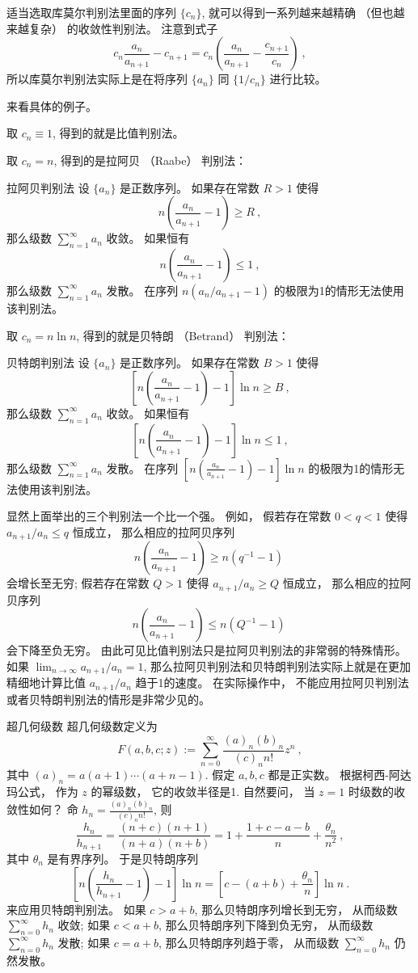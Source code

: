 适当选取库莫尔判别法里面的序列 $\{c_n\}$, 就可以得到一系列越来越精确 （但也越来越复杂） 的收敛性判别法。 注意到式子
$$
c_n\frac{a_n}{a_{n+1}}-c_{n+1}=c_n\left(\frac{a_n}{a_{n+1}}-\frac{c_{n+1}}{c_n}\right)~,
$$
所以库莫尔判别法实际上是在将序列 $\{a_n\}$ 同 $\{1/c_n\}$ 进行比较。

来看具体的例子。 

取 $c_n\equiv1$, 得到的就是比值判别法。

取 $c_n=n$, 得到的是拉阿贝 （Raabe） 判别法：

\begin{theorem}{拉阿贝判别法}
设 $\{a_n\}$ 是正数序列。 如果存在常数 $R>1$ 使得
$$
n\left(\frac{a_n}{a_{n+1}}-1\right)\geq R~,
$$
那么级数 $\sum_{n=1}^\infty a_n$ 收敛。 如果恒有
$$
n\left(\frac{a_n}{a_{n+1}}-1\right)\leq 1~,
$$
那么级数 $\sum_{n=1}^\infty a_n$ 发散。 在序列 $n(a_n/a_{n+1}-1)$ 的极限为1的情形无法使用该判别法。
\end{theorem}

取 $c_n=n\ln n$, 得到的就是贝特朗 （Betrand） 判别法：
\begin{theorem}{贝特朗判别法}
设 $\{a_n\}$ 是正数序列。 如果存在常数 $B>1$ 使得
$$
\left[n\left(\frac{a_n}{a_{n+1}}-1\right)-1\right]\ln n\geq B~,
$$
那么级数 $\sum_{n=1}^\infty a_n$ 收敛。 如果恒有
$$
\left[n\left(\frac{a_n}{a_{n+1}}-1\right)-1\right]\ln n\leq1~,
$$
那么级数 $\sum_{n=1}^\infty a_n$ 发散。 在序列 $\left[n\left(\frac{a_n}{a_{n+1}}-1\right)-1\right]\ln n$ 的极限为1的情形无法使用该判别法。
\end{theorem}

显然上面举出的三个判别法一个比一个强。 例如， 假若存在常数 $0<q<1$ 使得 $a_{n+1}/a_{n}\leq q$ 恒成立， 那么相应的拉阿贝序列
$$
n\left(\frac{a_n}{a_{n+1}}-1\right)\geq n(q^{-1}-1)~
$$
会增长至无穷; 假若存在常数 $Q>1$ 使得 $a_{n+1}/a_{n}\geq Q$ 恒成立， 那么相应的拉阿贝序列
$$
n\left(\frac{a_n}{a_{n+1}}-1\right)\leq n(Q^{-1}-1)~
$$
会下降至负无穷。 由此可见比值判别法只是拉阿贝判别法的非常弱的特殊情形。 如果 $\lim_{n\to\infty}a_{n+1}/a_{n}=1$, 那么拉阿贝判别法和贝特朗判别法实际上就是在更加精细地计算比值 $a_{n+1}/a_{n}$ 趋于1的速度。 在实际操作中， 不能应用拉阿贝判别法或者贝特朗判别法的情形是非常少见的。

\begin{example}{超几何级数}
超几何级数定义为
$$
F(a,b,c;z):=\sum_{n=0}^\infty\frac{(a)_n(b)_n}{(c)_nn!}z^{n}~,
$$
其中 $(a)_n=a(a+1)\dotsm(a+n-1)$. 假定 $a,b,c$ 都是正实数。 根据柯西-阿达玛公式， 作为 $z$ 的幂级数， 它的收敛半径是1. 自然要问， 当 $z=1$ 时级数的收敛性如何？ 
命 $h_n=\frac{(a)_n(b)_n}{(c)_nn!}$, 则
$$
\frac{h_n}{h_{n+1}}=\frac{(n+c)(n+1)}{(n+a)(n+b)}
=1+\frac{1+c-a-b}{n}+\frac{\theta_n}{n^2}~,
$$
其中 $\theta_n$ 是有界序列。 于是贝特朗序列
$$
\left[n\left(\frac{h_n}{h_{n+1}}-1\right)-1\right]\ln n
=\left[c-(a+b)+\frac{\theta_n}{n}\right]\ln n~.
$$
来应用贝特朗判别法。 如果 $c>a+b$, 那么贝特朗序列增长到无穷， 从而级数 $\sum_{n=0}^\infty h_n$ 收敛; 如果 $c<a+b$, 那么贝特朗序列下降到负无穷， 从而级数 $\sum_{n=0}^\infty h_n$ 发散; 如果 $c=a+b$, 那么贝特朗序列趋于零， 从而级数 $\sum_{n=0}^\infty h_n$ 仍然发散。
\end{example}
